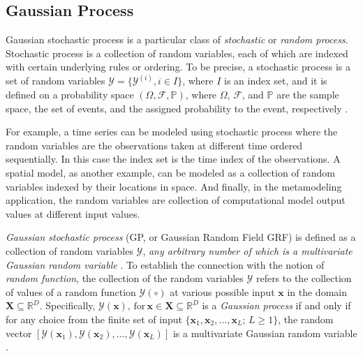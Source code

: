 \subsection{Gaussian Process}\label{sub:gp_gp}

Gaussian stochastic process is a particular class of \emph{stochastic} or \emph{random process}.
Stochastic process is a collection of random variables, each of which are indexed with certain underlying rules or ordering.
To be precise, a stochastic process is a set of random variables $\bm{\mathcal{Y}} = \{\mathcal{Y}^{(i)}, i \in I\}$, where $I$ is an index set, 
and it is defined on a probability space $(\Omega, \mathcal{F}, \mathbb{P})$, 
where $\Omega$, $\mathcal{F}$, and $\mathbb{P}$ are the sample space, the set of events, and the assigned probability to the event, respectively \cite{Syski2014}.

For example, a time series can be modeled using stochastic process where the random variables are the observations taken at different time ordered sequentially.
In this case the index set is the time index of the observations.
A spatial model, as another example, can be modeled as a collection of random variables indexed by their locations in space.
And finally, in the metamodeling application, the random variables are collection of computational model output values at different input values.

\emph{Gaussian stochastic process} (GP, or Gaussian Random Field GRF) is defined as a collection of random variables $\bm{\mathcal{Y}}$, 
\emph{any arbitrary number of which is a multivariate Gaussian random variable} \cite{Rasmussen2006, Debicki2014}.
To establish the connection with the notion of \emph{random function}, the collection of the random variables $\bm{\mathcal{Y}}$ refers to the collection of values of a random function $\mathcal{Y}(\circ)$ at various possible input $\bm{x}$ in the domain $\boldsymbol{X} \subseteq \mathbb{R}^D$.
Specifically, $\mathcal{Y}(\bm{x}), \, \text{for} \, \bm{x} \in \boldsymbol{X} \subseteq \mathbb{R}^D$ is a \emph{Gaussian process} if and only if for any choice from the finite set of input $\{\bm{x}_1, \bm{x}_2, \ldots, \bm{x}_L ; \, L \geq 1\}$, the random vector $\left[\mathcal{Y}(\bm{x}_1), \mathcal{Y}(\bm{x}_2), \ldots, \mathcal{Y}(\bm{x}_L)\right]$ is a multivariate Gaussian random variable \cite{Santner2003}.

